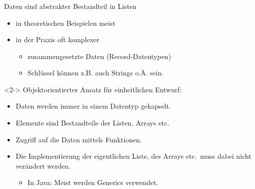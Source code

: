 \begin{frame}
\frametitle{\insertsection}
\begin{block}
{Daten sind abstrakter Bestandteil in Listen}
\begin{itemize}
	\item in theoretischen Beispielen meist 
	\item in der Praxis oft komplexer
	\begin{itemize}
	    \item zusammengesetzte Daten (Record-Datentypen)
	    \item Schlüssel können z.B. auch Strings o.Ä. sein.
	\end{itemize}
\end{itemize}
\end{block}

\begin{block}<2->
{Objektorientierter Ansatz für einheitlichen Entwurf:}
\begin{itemize}
    \item Daten werden immer in einem Datentyp  \alert{gekapselt}.
    \item Elemente sind Bestandteile der Listen, Arrays etc.
    \item Zugriff auf die Daten mittels Funktionen.
   \item \alert{Die Implementierung der eigentlichen Liste, des Arrays etc.\
        muss dabei nicht verändert werden.}
   \begin{itemize}
     \item In Java: Meist werden Generics verwendet.
   \end{itemize}
\end{itemize}
\end{block}
\end{frame}

\endinput

\begin{frame}
\frametitle{\insertsection}
\begin{block}
{}
\end{block}
\end{frame}